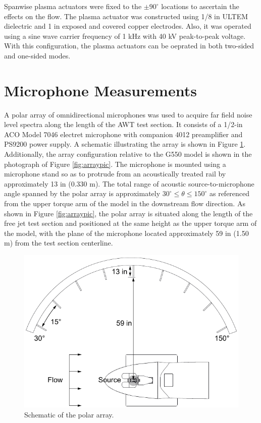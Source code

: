 Spanwise plasma actuators were fixed to the $\pm 90^\circ$ locations to ascertain the effects on the flow. The plasma actuator was constructed using 1/8 in ULTEM dielectric and 1 in exposed and covered copper electrodes. Also, it was operated using a sine wave carrier frequency of 1 kHz with 40 kV peak-to-peak voltage. With this configuration, the plasma actuators can be oeprated in both two-sided and one-sided modes.

\section{Microphone Measurements}
A polar array of omnidirectional microphones was used to acquire far field noise level spectra along the length of the AWT test section. It consists of a 1/2-in ACO Model 7046 electret microphone with companion 4012 preamplifier and PS9200 power supply. A schematic illustrating the array is shown in Figure \ref{fig:array}. Additionally, the array configuration relative to the G550 model is shown in the photograph of Figure \ref{fig:arraypic}. The microphone is mounted using a microphone stand so as to protrude from an acoustically treated rail by approximately 13 in (0.330 m). The total range of acoustic source-to-microphone angle spanned by the polar array is approximately $30^\circ \leq \theta \leq 150^\circ$ as referenced from the upper torque arm of the model in the downstream flow direction. As shown in Figure \ref{fig:arraypic}, the polar array is situated along the length of the free jet test section and positioned at the same height as the upper torque arm of the model, with the plane of the microphone located approximately 59 in (1.50 m) from the test section centerline.

\begin{figure}
	\begin{center}
		\centerline{\includegraphics[scale=1.2]{figures/array_schematic}}
		\caption{Schematic of the polar array.}
		\label{fig:array}
	\end{center}
\end{figure}

